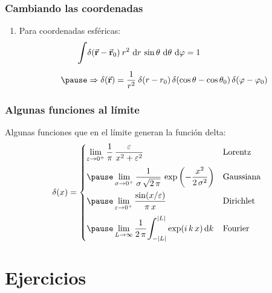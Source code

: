 \documentclass[12pt]{beamer}
\begin{document}
\begin{frame}
\frametitle{Cambiando las coordenadas}
\begin{enumerate}[<+->]
\conti
\item Para coordenadas esféricas:
\begin{eqnarray*}
\begin{aligned}
\scaleint{6ex} & \delta (\va{r} - \va{r}_{0}) \: r^{2} \, \dd{r} \, \sin \theta \, \dd{\theta} \, \dd{\varphi} = 1 \\[0.5em] \pause
&\Rightarrow \delta (\va{r}) = \dfrac{1}{r^{2}} \: \delta (r - r_{0}) \, \delta (\cos \theta - \cos \theta_{0}) \, \delta (\varphi - \varphi_{0})
\end{aligned}
\end{eqnarray*}
\end{enumerate}
\end{frame}

\begin{frame}
\frametitle{Algunas funciones al límite}
Algunas funciones que en el límite generan la función delta:
\pause
\begin{eqnarray*}
\begin{aligned}
\delta(x) = \begin{cases}
\displaystyle
\lim_{\varepsilon \to 0^{+}} \dfrac{1}{\pi} \, \dfrac{\varepsilon}{x^{2} + \varepsilon^{2}} & \mbox{Lorentz} \\[1em] \pause 
\displaystyle
\lim_{\sigma \to 0^{+}} \dfrac{1}{\sigma \, \sqrt{2 \, \pi}} \, \exp \left( - \dfrac{x^{2}}{2 \, \sigma^{2}} \right) & \mbox{Gaussiana} \\[1em] \pause
\displaystyle \lim_{\varepsilon \to 0^{+}} \dfrac{\sin(x / \varepsilon)}{ \pi \, x} & \mbox{Dirichlet} \\[1em] \pause
\displaystyle \lim_{L \to \infty} \dfrac{1}{2 \, \pi} \scaleint{6ex}_{\bs - \abs{L}}^{\abs{L}} \exp(i \, k \, x) \dd{k} & \mbox{Fourier}
\end{cases}
\end{aligned}
\end{eqnarray*}
\end{frame}

\section{Ejercicios}
\end{document}
